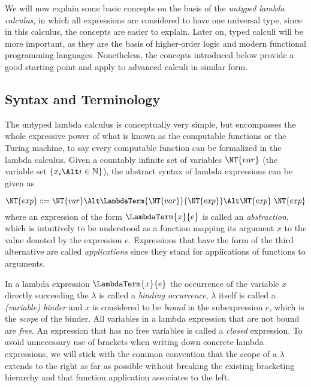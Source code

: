 We will now explain some basic concepts on the basis of the \emph{untyped lambda
  calculus}, in which all expressions are considered to have one universal type,
since in this calculus, the concepts are easier to explain.  Later on, typed
calculi will be more important, as they are the basis of higher-order logic and
modern functional programming languages. Nonetheless, the concepts introduced
below provide a good starting point and apply to advanced calculi in similar form.


\subsection{Syntax and Terminology}
\label{sec:syntax-terminology}


The untyped lambda calculus is conceptually very simple, but encompasses the
whole expressive power of what is known as the computable functions or the
Turing machine, \IE to say every computable function can be formalized in the
lambda calculus. Given a countably infinite set of variables $\NT{var}$ (\EG the
variable set $\{x_i \Alt i \in \mathbb{N}\}$), the abstract syntax of lambda
expressions can be given as

\begin{equation}
  \label{eq:syntax-lambda}
  \NT{exp}  ::=  \NT{var} \Alt
  \LambdaTerm{\NT{var}}{\NT{exp}} \Alt \NT{exp}\ \NT{exp}
\end{equation}
where an expression of the form $\LambdaTerm{x}{e}$ is called an
\emph{abstraction}, which is intuitively to be understood as a function mapping
its argument $x$ to the value denoted by the expression $e$. Expressions that
have the form of the third alternative are called \emph{applications} since they
stand for applications of functions to arguments.

In a lambda expression $\LambdaTerm{x}{e}$ the occurrence of the variable $x$
directly succeeding the $\lambda$ is called a \emph{binding occurrence}, $\lambda$ itself is
called a \emph{(variable) binder} and $x$ is considered to be \emph{bound} in
the subexpression $e$, which is the \emph{scope} of the binder. All variables in
a lambda expression that are not bound are \emph{free}. An expression that has
no free variables is called a \emph{closed} expression. To avoid
unnecessary use of brackets when writing down concrete lambda expressions, we
will stick with the common convention that the scope of a $\lambda$ extends to the
right as far as possible without breaking the existing bracketing hierarchy and
that function application associates to the left.

